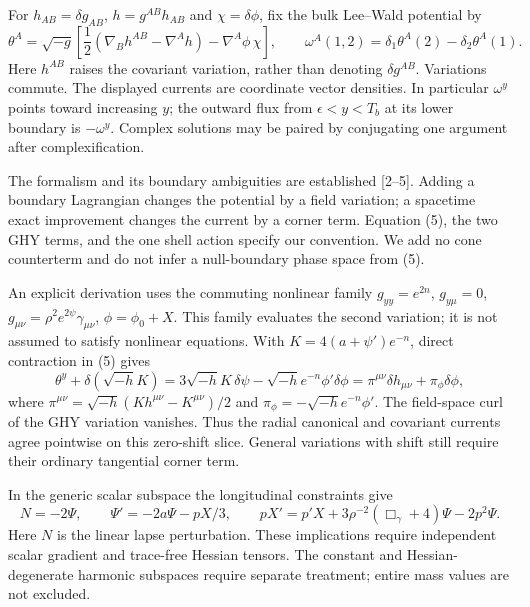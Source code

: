 \documentclass[
  11pt,
]{article}
\begin{document}
For \(h_{AB}=\delta g_{AB}\), \(h=g^{AB}h_{AB}\) and
\(\chi=\delta\phi\), fix the bulk Lee--Wald potential by \[
 \theta^A=\sqrt{-g}\left[\frac12(\nabla_Bh^{AB}-\nabla^Ah)
                         -\nabla^A\phi\,\chi\right],\qquad
 \omega^A(1,2)=\delta_1\theta^A(2)-\delta_2\theta^A(1). \tag{5}
\] Here \(h^{AB}\) raises the covariant variation, rather than denoting
\(\delta g^{AB}\). Variations commute. The displayed currents are
coordinate vector densities. In particular \(\omega^y\) points toward
increasing \(y\); the outward flux from \(\epsilon<y<T_b\) at its lower
boundary is \(-\omega^y\). Complex solutions may be paired by
conjugating one argument after complexification.

The formalism and its boundary ambiguities are established {[}2--5{]}.
Adding a boundary Lagrangian changes the potential by a field variation;
a spacetime exact improvement changes the current by a corner term.
Equation (5), the two GHY terms, and the one shell action specify our
convention. We add no cone counterterm and do not infer a null-boundary
phase space from (5).

An explicit derivation uses the commuting nonlinear family
\(g_{yy}=e^{2n}\), \(g_{y\mu}=0\),
\(g_{\mu\nu}=\rho^2e^{2\psi}\gamma_{\mu\nu}\), \(\phi=\phi_0+X\). This
family evaluates the second variation; it is not assumed to satisfy
nonlinear equations. With \(K=4(a+\psi')e^{-n}\), direct contraction in
(5) gives \[
 \theta^y+\delta(\sqrt{-h}K)
 =3\sqrt{-h}K\,\delta\psi-\sqrt{-h}e^{-n}\phi'\delta\phi
 =\pi^{\mu\nu}\delta h_{\mu\nu}+\pi_\phi\delta\phi,
                                                               \tag{6}
\] where \(\pi^{\mu\nu}=\sqrt{-h}(Kh^{\mu\nu}-K^{\mu\nu})/2\) and
\(\pi_\phi=-\sqrt{-h}e^{-n}\phi'\). The field-space curl of the GHY
variation vanishes. Thus the radial canonical and covariant currents
agree pointwise on this zero-shift slice. General variations with shift
still require their ordinary tangential corner term.

In the generic scalar subspace the longitudinal constraints give \[
 N=-2\Psi,\qquad
 \Psi'=-2a\Psi-pX/3,\qquad
 pX'=p'X+3\rho^{-2}(\Box_\gamma+4)\Psi-2p^2\Psi.        \tag{7}
\] Here \(N\) is the linear lapse perturbation. These implications
require independent scalar gradient and trace-free Hessian tensors. The
constant and Hessian-degenerate harmonic subspaces require separate
treatment; entire mass values are not excluded.
\end{document}
